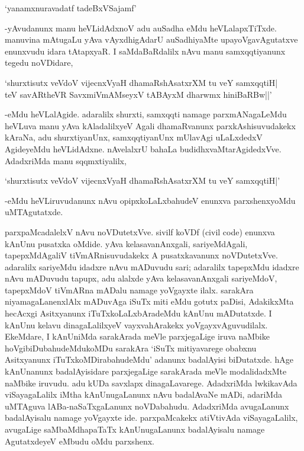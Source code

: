 \begin{shloka}
`yanamxnuravadatf tadeBxVSajamf'
\end{shloka}

-yAvudanunx manu heVLidAdxnoV adu auSadha eMdu heVLalapxTiTxde. manuvina mAtugaLu yAva vAyxdhigAdarU auSadhiyaMte upayoVgavAgutatxve enunxvudu idara tAtapxyaR. I saMdaBaRdalilx nAvu manu samxqqtiyanunx tegedu noVDidare,

\begin{shloka}
`shurxtisutx veVdoV vijecnxVyaH dhamaRshAsatxrXM tu veY samxqqtiH|\\
teV savARtheVR SavxmiVmAMseyxV tABAyxM dharwmx hiniBaRBw||'
\end{shloka}
 
-eMdu heVLalAgide. adaralilx shurxti, samxqqti namage parxmANagaLeMdu heVLuva manu yAva kAladalilxyeV Agali dhamaRvanunx parxkAshisuvudakekx kAraNa, adu shurxtiyanUnx, samxqqtiyanUnx mUlavAgi uLaLxdedxV AgideyeMdu heVLidAdxne. nAvelalxrU bahaLa budidhxvaMtarAgidedxVve. AdadxriMda manu sqqmxtiyalilx,

\begin{shloka} 
`shurxtisutx veVdoV vijecnxVyaH dhamaRshAsatxrXM tu veY samxqqtiH|'
\end{shloka}

-eMdu heVLiruvudanunx nAvu opipxkoLaLxbahudeV enunxva parxshenxyoMdu uMTAgutatxde.

parxpaMcadalelxV nAvu noVDutetxVve. sivilf koVDf (civil code) enunxva kAnUnu pusatxka oMdide. yAva kelasavanAnxgali, sariyeMdAgali, tapepxMdAgaliV tiVmARnisuvudakekx A pusatxkavanunx noVDutetxVve. adaralilx sariyeMdu idadxre nAvu mADuvudu sari; adaralilx tapepxMdu idadxre nAvu mADuvudu tapupx, adu alalxde yAva kelasavanAnxgali sariyeMdoV, tapepxMdoV tiVmARna mADalu namage yoVgayxte ilalx. sarakAra niyamagaLanenxlAlx mADuvAga iSuTx miti eMdu gotutx paDisi, AdakikxMta hecAcxgi Asitxyanunx iTuTxkoLaLxbAradeMdu kAnUnu mADutatxde. I kAnUnu kelavu dinagaLalilxyeV vayxvahArakekx yoVgayxvAguvudilalx. EkeMdare, I kAnUniMda sarakArada meVle parxjegaLige iruva naMbike hoVgibiDubahudeMdukoMDu sarakAra `iSuTx mitiyavarege obabxnu Asitxyanunx iTuTxkoMDirabahudeMdu' adanunx badalAyisi biDutatxde. hAge kAnUnanunx badalAyisidare parxjegaLige sarakArada meVle modalidadxMte naMbike iruvudu. adu kUDa savxlapx dinagaLavarege. AdadxriMda lwkikavAda viSayagaLalilx iMtha kAnUnugaLanunx nAvu badalAvaNe mADi, adariMda uMTAguva lABa-naSaTxgaLanunx noVDabahudu. AdadxriMda avugaLanunx badalAyisalu namage yoVgayxte ide. parxpaMcakekx atiVtivAda viSayagaLalilx, avugaLige saMbaMdhapaTaTx kAnUnugaLanunx badalAyisalu namage AgutatxdeyeV eMbudu oMdu parxshenx.

